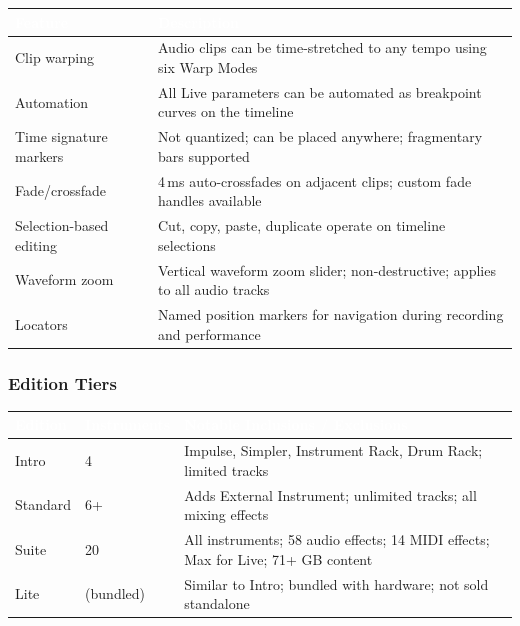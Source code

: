 \documentclass[11pt,letterpaper]{article}
\newcommand{\tableheader}[1]{\textbf{\sffamily\textcolor{white}{#1}}}
\begin{document}
\begin{center}
\begin{tabularx}{\textwidth}{L{4.5cm}X}
\toprule
{}
\tableheader{Feature} & \tableheader{Description} \\
\midrule
Clip warping & Audio clips can be time-stretched to any tempo using six Warp Modes \\
Automation & All Live parameters can be automated as breakpoint curves on the timeline \\
Time signature markers & Not quantized; can be placed anywhere; fragmentary bars supported \\
Fade/crossfade & 4\,ms auto-crossfades on adjacent clips; custom fade handles available \\
Selection-based editing & Cut, copy, paste, duplicate operate on timeline selections \\
Waveform zoom & Vertical waveform zoom slider; non-destructive; applies to all audio tracks \\
Locators & Named position markers for navigation during recording and performance \\
\bottomrule
\end{tabularx}
\end{center}

\subsubsection{Edition Tiers}

\begin{center}
\begin{tabularx}{\textwidth}{L{2.5cm}L{2.5cm}X}
\toprule
{}
\tableheader{Edition} & \tableheader{Instruments} & \tableheader{Notable Inclusions / Exclusions} \\
\midrule
Intro & 4 & Impulse, Simpler, Instrument Rack, Drum Rack; limited tracks \\
Standard & 6+ & Adds External Instrument; unlimited tracks; all mixing effects \\
Suite & 20 & All instruments; 58 audio effects; 14 MIDI effects; Max for Live; 71+ GB content \\
Lite & (bundled) & Similar to Intro; bundled with hardware; not sold standalone \\
\bottomrule
\end{tabularx}
\end{center}
\end{document}
